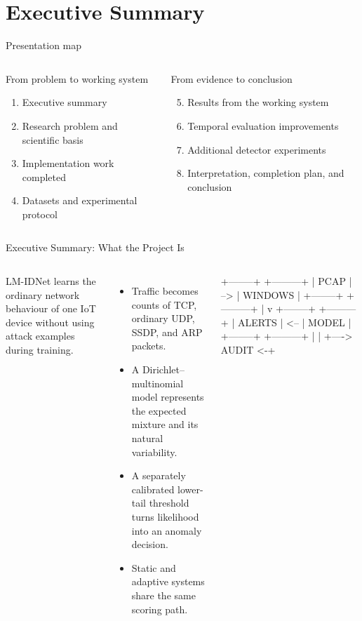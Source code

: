 \documentclass[aspectratio=169,10pt]{beamer}
\newcommand{\projectname}{LM-IDNet}
\begin{document}
\section{Executive Summary}

\begin{frame}{Presentation map}
\begin{columns}[T,onlytextwidth]
\begin{block}{From problem to working system}
\begin{enumerate}
  \item Executive summary
  \item Research problem and scientific basis
  \item Implementation work completed
  \item Datasets and experimental protocol
\end{enumerate}
\end{block}

\begin{block}{From evidence to conclusion}
\begin{enumerate}
\setcounter{enumi}{4}
  \item Results from the working system
  \item Temporal evaluation improvements
  \item Additional detector experiments
  \item Interpretation, completion plan, and conclusion
\end{enumerate}
\end{block}
\end{columns}
\end{frame}

\begin{frame}[fragile]{Executive Summary: What the Project Is}
\begin{columns}[T,onlytextwidth]
\projectname{} learns the ordinary network behaviour of one IoT device without
using attack examples during training.

\vspace{0.35cm}
\begin{itemize}
  \item Traffic becomes counts of TCP, ordinary UDP, SSDP, and ARP packets.
  \item A Dirichlet--multinomial model represents the expected mixture and its
  natural variability.
  \item A separately calibrated lower-tail threshold turns likelihood into an
  anomaly decision.
  \item Static and adaptive systems share the same scoring path.
\end{itemize}

\begin{asciiart}
+--------+     +---------+
|  PCAP  | --> | WINDOWS |
+--------+     +---------+
                    |
                    v
+--------+     +---------+
| ALERTS | <-- |  MODEL  |
+--------+     +---------+
     |              |
     +----> AUDIT <-+
\end{asciiart}
\end{columns}
\end{frame}
\end{document}

